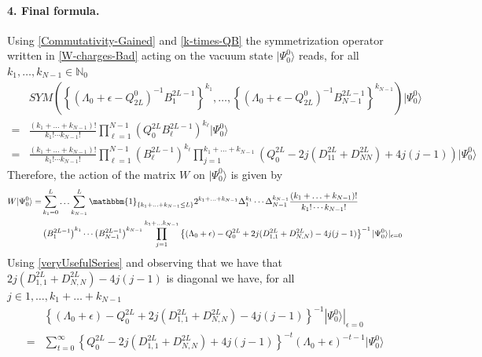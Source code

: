 \documentclass[10pt]{article}
\numberwithin{equation}{section}
\numberwithin{equation}{subsection}
\begin{document}
\paragraph{4. Final formula.} Using \eqref{Commutativity-Gained} and \eqref{k-times-QB} the symmetrization operator written in \eqref{W-charges-Bad} acting on the vacuum state $|\Psi_{0}^{0}\rangle$ reads, for all $k_{1},\ldots,k_{N-1}\in\mathbb{N}_{0}$
\begin{align}
	&SYM\left(\left\{\left(\Lambda_{0}+\epsilon-Q_{2L}^{0}\right)^{-1}B_{1}^{2L-1}\right\}^{k_{1}},\ldots,\left\{\left(\Lambda_{0}+\epsilon-Q_{2L}^{0}\right)^{-1}B_{N-1}^{2L-1}\right\}^{k_{N-1}}\right)
	|\Psi_{0}^{0}\rangle\nonumber
	\\=&\frac{	(k_{1}+\ldots+k_{N-1})!}{k_{1}!\cdots k_{N-1}!}	\prod_{\ell=1}^{N-1}\left(Q_{0}^{2L}B_{\ell}^{2L-1}\right)^{k_{\ell}}|\Psi_{0}^{0}\rangle\nonumber
	\\=&\frac{	(k_{1}+\ldots+k_{N-1})!}{k_{1}!\cdots k_{N-1}!}\prod_{\ell=1}^{N-1}\left(B_{\ell}^{2L-1}\right)^{k_{\ell}}\prod_{j=1}^{k_{1}+\ldots+k_{N-1}}\left(Q_{0}^{2L}-2j(D_{11}^{2L}+D_{NN}^{2L})+4j(j-1)\right)|\Psi_{0}^{0}\rangle
\end{align}
Therefore, the action of the matrix $W$ on $|\Psi_{0}^{0}\rangle$ is given by
\begin{equation}\label{intermediate-W-ss}
	\begin{split}
		W|\Psi_{0}^{0}\rangle =&\sum_{k_{1}=0}^{L}\ldots\sum_{k_{N-1}}^{L}\mathbbm{1}_{\{k_{1}+\ldots+k_{N-1}\leq L\}}2^{k_{1}+\ldots+k_{N-1}}\Delta_{1}^{k_{1}}\cdots \Delta_{N-1}^{k_{N-1}}\frac{	(k_{1}+\ldots+k_{N-1})!}{k_{1}!\cdots k_{N-1}!}\\&
		\left(B_{1}^{2L-1}\right)^{k_{1}}\cdots\left( B_{N-1}^{2L-1}\right)^{k_{N-1}}\prod_{j=1}^{k_{1}+\ldots k_{N-1}}\left\{(\Lambda_{0}+\epsilon)-Q_{0}^{2L}+2j(D_{1,1}^{2L}+D_{N,N}^{2L})-4j(j-1)\right\}^{-1}|\Psi_{0}^{0}\rangle|_{\epsilon=0}
	\end{split}
\end{equation}
Using \eqref{veryUsefulSeries} and observing that  we have that $2j(D_{1,1}^{2L}+D_{N,N}^{2L})-4j(j-1)$ is diagonal we have, for all $j\in{1,\ldots,k_{1}+\ldots+k_{N-1}}$ 
\begin{align}
&\left\{(\Lambda_{0}+\epsilon)-Q_{0}^{2L}+2j(D_{1,1}^{2L}+D_{N,N}^{2L})-4j(j-1)\right\}^{-1}|\Psi_{0}^{0}\rangle|_{\epsilon=0}\\=&
\sum_{t=0}^{\infty}\left\{Q_{0}^{2L}-2j(D_{1,1}^{2L}+D_{N,N}^{2L})+4j(j-1)\right\}^{-t}\left(\Lambda_{0}+\epsilon\right)^{-t-1}|\Psi_{0}^{0}\rangle
\end{align}
\end{document}
